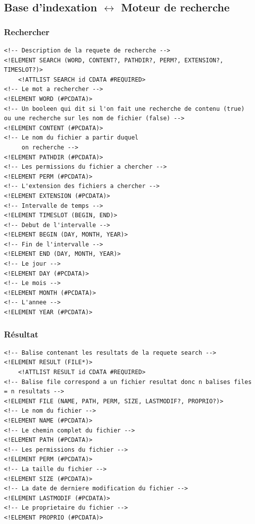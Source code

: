 \documentclass[a4paper,12pt]{report}
\begin{document}
\newpage
\subsection{Base d'indexation $\leftrightarrow$ Moteur de recherche}

\subsubsection{Rechercher}\label{dtd_bi_mr_search}
\begin{lstlisting}[frame=single]
<!-- Description de la requete de recherche -->
<!ELEMENT SEARCH (WORD, CONTENT?, PATHDIR?, PERM?, EXTENSION?, TIMESLOT?)>
	<!ATTLIST SEARCH id CDATA #REQUIRED>
<!-- Le mot a rechercher -->
<!ELEMENT WORD (#PCDATA)>
<!-- Un booleen qui dit si l'on fait une recherche de contenu (true) ou une recherche sur les nom de fichier (false) -->
<!ELEMENT CONTENT (#PCDATA)>
<!-- Le nom du fichier a partir duquel
     on recherche -->
<!ELEMENT PATHDIR (#PCDATA)>
<!-- Les permissions du fichier a chercher -->
<!ELEMENT PERM (#PCDATA)>
<!-- L'extension des fichiers a chercher -->
<!ELEMENT EXTENSION (#PCDATA)>
<!-- Intervalle de temps -->
<!ELEMENT TIMESLOT (BEGIN, END)>
<!-- Debut de l'intervalle -->
<!ELEMENT BEGIN (DAY, MONTH, YEAR)>
<!-- Fin de l'intervalle -->
<!ELEMENT END (DAY, MONTH, YEAR)>
<!-- Le jour -->
<!ELEMENT DAY (#PCDATA)>
<!-- Le mois -->
<!ELEMENT MONTH (#PCDATA)>
<!-- L'annee -->
<!ELEMENT YEAR (#PCDATA)>
\end{lstlisting}

\subsubsection{Résultat}\label{dtd_bi_mr_result}
\begin{lstlisting}[frame=single]
<!-- Balise contenant les resultats de la requete search -->
<!ELEMENT RESULT (FILE*)>
	<!ATTLIST RESULT id CDATA #REQUIRED>
<!-- Balise file correspond a un fichier resultat donc n balises files = n resultats -->
<!ELEMENT FILE (NAME, PATH, PERM, SIZE, LASTMODIF?, PROPRIO?)>
<!-- Le nom du fichier -->
<!ELEMENT NAME (#PCDATA)>
<!-- Le chemin complet du fichier -->
<!ELEMENT PATH (#PCDATA)>
<!-- Les permissions du fichier -->
<!ELEMENT PERM (#PCDATA)>
<!-- La taille du fichier -->
<!ELEMENT SIZE (#PCDATA)>
<!-- La date de derniere modification du fichier -->
<!ELEMENT LASTMODIF (#PCDATA)>
<!-- Le proprietaire du fichier -->
<!ELEMENT PROPRIO (#PCDATA)>
\end{lstlisting}
\end{document}
